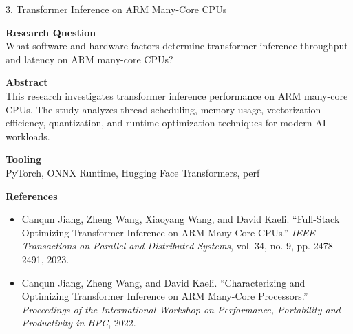 \documentclass[aspectratio=169]{beamer}
\begin{document}
\begin{frame}{3. Transformer Inference on ARM Many-Core CPUs}
\small

\textbf{Research Question}\\
What software and hardware factors determine transformer inference throughput and latency on ARM many-core CPUs?

\vspace{0.35em}

\textbf{Abstract}\\
This research investigates transformer inference performance on ARM many-core CPUs. The study analyzes thread scheduling, memory usage, vectorization efficiency, quantization, and runtime optimization techniques for modern AI workloads.

\vspace{0.35em}

\textbf{Tooling}\\
PyTorch, ONNX Runtime, Hugging Face Transformers, perf

\vspace{0.35em}

\textbf{References}
\begin{itemize}
\item Canqun Jiang, Zheng Wang, Xiaoyang Wang, and David Kaeli. ``Full-Stack Optimizing Transformer Inference on ARM Many-Core CPUs.'' \emph{IEEE Transactions on Parallel and Distributed Systems}, vol. 34, no. 9, pp. 2478--2491, 2023.

\item Canqun Jiang, Zheng Wang, and David Kaeli. ``Characterizing and Optimizing Transformer Inference on ARM Many-Core Processors.'' \emph{Proceedings of the International Workshop on Performance, Portability and Productivity in HPC}, 2022.
\end{itemize}

\end{frame}

\end{document}
